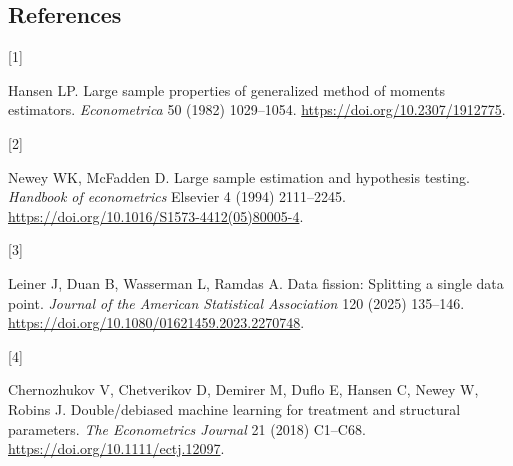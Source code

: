 \documentclass[
  american,
  11pt,
]{article}
\newlength{\cslhangindent}
\newlength{\csllabelwidth}
\newenvironment{CSLReferences}[2] %
 {\begin{list}{}{%
  \setlength{\itemindent}{0pt}
  \setlength{\leftmargin}{0pt}
  \setlength{\parsep}{0pt}
  \ifodd #1
   \setlength{\leftmargin}{\cslhangindent}
   \setlength{\itemindent}{-1\cslhangindent}
  \fi
  \setlength{\itemsep}{#2\baselineskip}}}
 {\end{list}}
\newcommand{\CSLLeftMargin}[1]{\parbox[t]{\csllabelwidth}{\strut#1\strut}}
\newcommand{\CSLRightInline}[1]{\parbox[t]{\linewidth - \csllabelwidth}{\strut#1\strut}}
\begin{document}
\subsection*{References}\label{references}

\protect{}\label{refs}
\begin{CSLReferences}{0}{0}
\CSLLeftMargin{{[}1{]} }%
\CSLRightInline{Hansen LP. Large sample properties of generalized method
of moments estimators. \emph{Econometrica} 50 (1982) 1029--1054.
\url{https://doi.org/10.2307/1912775}.}

\CSLLeftMargin{{[}2{]} }%
\CSLRightInline{Newey WK, McFadden D. Large sample estimation and
hypothesis testing. \emph{Handbook of econometrics} Elsevier 4 (1994)
2111--2245. \url{https://doi.org/10.1016/S1573-4412(05)80005-4}.}

\CSLLeftMargin{{[}3{]} }%
\CSLRightInline{Leiner J, Duan B, Wasserman L, Ramdas A. Data fission:
Splitting a single data point. \emph{Journal of the American Statistical
Association} 120 (2025) 135--146.
\url{https://doi.org/10.1080/01621459.2023.2270748}.}

\CSLLeftMargin{{[}4{]} }%
\CSLRightInline{Chernozhukov V, Chetverikov D, Demirer M, Duflo E,
Hansen C, Newey W, Robins J. Double/debiased machine learning for
treatment and structural parameters. \emph{The Econometrics Journal} 21
(2018) C1--C68. \url{https://doi.org/10.1111/ectj.12097}.}

\end{CSLReferences}
\end{document}
